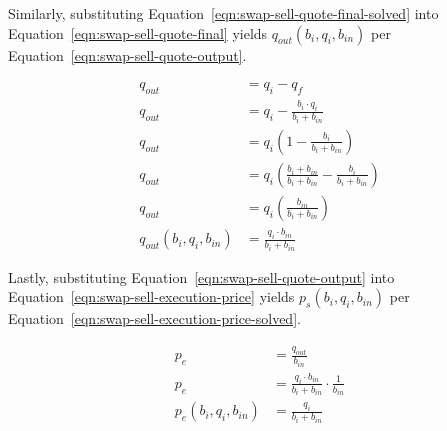 \documentclass[table, twocolumn]{article}
\begin{document}
Similarly, substituting Equation~\ref{eqn:swap-sell-quote-final-solved} into
Equation~\ref{eqn:swap-sell-quote-final} yields $q_{out}(b_i, q_i, b_{in})$
per Equation~\ref{eqn:swap-sell-quote-output}.

\begin{align}\label{eqn:swap-sell-quote-output}
	q_{out}                    & = q_i - q_f \nonumber                                \\
	q_{out}                    & = q_i - \frac{b_i \cdot q_i}{b_i + b_{in}} \nonumber \\
	q_{out}                    & =
	q_i \left( 1 - \frac{b_i}{b_i + b_{in}} \right) \nonumber                         \\
	q_{out}                    & = q_i \left(
	\frac{b_i + b_{in}}{b_i + b_{in}} - \frac{b_i}{b_i + b_{in}}
	\right) \nonumber                                                                 \\
	q_{out}                    & =
	q_i \left( \frac{b_{in}}{b_i + b_{in}} \right) \nonumber                          \\
	q_{out} (b_i, q_i, b_{in}) & = \frac{q_i \cdot b_{in}}{b_i + b_{in}}
\end{align}

Lastly, substituting Equation~\ref{eqn:swap-sell-quote-output} into
Equation~\ref{eqn:swap-sell-execution-price} yields $p_s(b_i, q_i, b_{in})$ per
Equation~\ref{eqn:swap-sell-execution-price-solved}.

\begin{align}\label{eqn:swap-sell-execution-price-solved}
	p_e                    & = \frac{q_{out}}{b_{in}} \nonumber            \\
	p_e                    & =
	\frac{q_i \cdot b_{in}}{b_i + b_{in}} \cdot \frac{1}{b_{in}} \nonumber \\
	p_e (b_i, q_i, b_{in}) & = \frac{q_i}{b_i + b_{in}}
\end{align}
\end{document}
